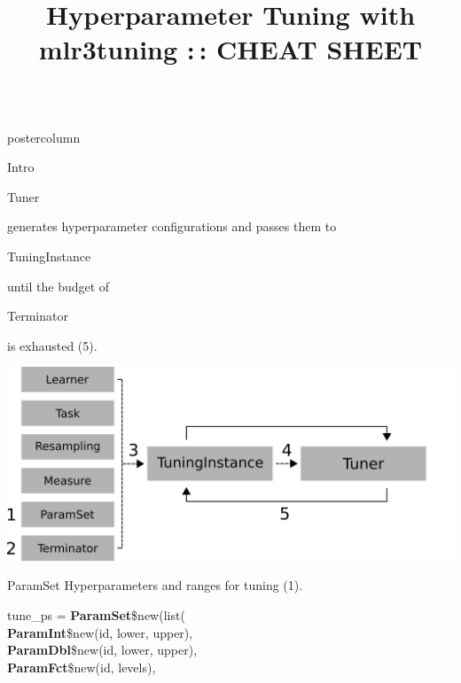 \documentclass{beamer}
\title{Hyperparameter Tuning with mlr3tuning :\,: CHEAT SHEET} %
\newlength{\columnheight} %
\newcommand{\codeinline}[1]{\begin{codeboxinline}#1\end{codeboxinline}}
\begin{document}
\begin{frame}[fragile]{}
	\begin{columns}
		\begin{column}{.245\textwidth}
			\begin{beamercolorbox}[center]{postercolumn}
				\begin{minipage}{.98\textwidth}
					\parbox[t][\columnheight]{\textwidth}{
						\begin{myblock}{Intro}

							\codeinline{Tuner} generates hyperparameter configurations and passes them to \codeinline{TuningInstance} until the budget of \codeinline{Terminator} is exhausted (5). 

						\includegraphics[width=\textwidth]{img/tuning_objects.png}
						\vspace{1em}
						\end{myblock}
						\begin{myblock}{ParamSet}
					        Hyperparameters and ranges for tuning (1).
							\\
							\begin{codeboxmultiline}[width=21cm]
								tune\_ps = \textbf{ParamSet}\$new(list(\\
								\hspace*{1ex}\textbf{ParamInt}\$new(id, lower, upper),\\
								\hspace*{1ex}\textbf{ParamDbl}\$new(id, lower, upper),\\
								\hspace*{1ex}\textbf{ParamFct}\$new(id, levels),\\

\end{codeboxmultiline}
\end{myblock}}
\end{minipage}
\end{beamercolorbox}
\end{column}
\end{columns}
\end{frame}
\end{document}
